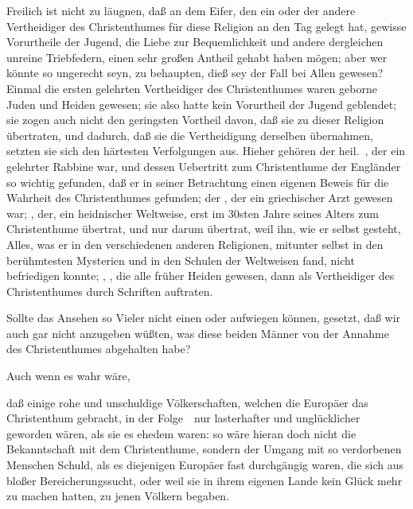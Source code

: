 \begin{aufza}
\begin{aufzb}
\item Freilich ist nicht zu läugnen, daß an dem Eifer, den ein oder der andere Vertheidiger des Christenthumes für diese Religion an den Tag gelegt hat, gewisse Vorurtheile der Jugend, die Liebe zur Bequemlichkeit und andere dergleichen unreine Triebfedern, einen sehr großen Antheil gehabt haben mögen; aber wer könnte so ungerecht seyn, zu behaupten, dieß sey der Fall bei Allen gewesen? Einmal die ersten gelehrten Vertheidiger des Christenthumes waren geborne Juden und Heiden gewesen; sie also hatte kein Vorurtheil der Jugend geblendet; sie zogen auch nicht den geringsten Vortheil davon, daß sie zu dieser Religion übertraten, und dadurch, daß sie die Vertheidigung derselben übernahmen, setzten sie sich den härtesten Verfolgungen aus. Hieher gehören der heil.\ , der ein gelehrter Rabbine war, und dessen Uebertritt zum Christenthume der Engländer  so wichtig gefunden, daß er in seiner Betrachtung einen eigenen Beweis für die Wahrheit des Christenthumes gefunden; der , der ein griechischer Arzt gewesen war; , der, ein heidnischer Weltweise, erst im 30sten Jahre seines Alters zum Christenthume übertrat, und nur darum übertrat, weil ihn, wie er selbst gesteht, Alles, was er in den verschiedenen anderen Religionen, mitunter selbst in den berühmtesten Mysterien und in den Schulen der Weltweisen fand, nicht befriedigen konnte; , \uA , die alle früher Heiden gewesen, dann als Vertheidiger des Christenthumes durch Schriften auftraten.
\item Sollte das Ansehen so Vieler nicht einen  oder  aufwiegen können, gesetzt, daß wir auch gar nicht anzugeben wüßten, was diese beiden Männer von der Annahme des Christenthumes abgehalten habe?
\end{aufzb}
\item Auch wenn es wahr wäre,
\begin{aufzb}
\item daß einige rohe und unschuldige Völkerschaften, welchen die Europäer das Christenthum gebracht, in der Folge~\ nur lasterhafter und unglücklicher geworden wären, als sie es ehedem waren: so wäre hieran doch nicht die Bekanntschaft mit dem Christenthume, sondern der Umgang mit so verdorbenen Menschen Schuld, als es diejenigen Europäer fast durchgängig waren, die sich aus bloßer Bereicherungssucht, oder weil sie in ihrem eigenen Lande kein Glück mehr zu machen hatten, zu jenen Völkern begaben.

\end{aufzb}
\end{aufza}
